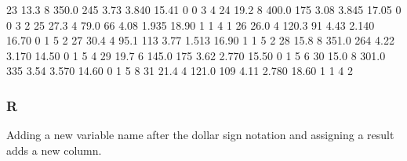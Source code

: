 \documentclass[
]{book}
\newenvironment{Shaded}{\begin{snugshade}}{\end{snugshade}}
\newcommand{\CommentTok}[1]{\textcolor[rgb]{0.56,0.35,0.01}{\textit{#1}}}
\newcommand{\DecValTok}[1]{\textcolor[rgb]{0.00,0.00,0.81}{#1}}
\newcommand{\ErrorTok}[1]{\textcolor[rgb]{0.64,0.00,0.00}{\textbf{#1}}}
\newcommand{\FloatTok}[1]{\textcolor[rgb]{0.00,0.00,0.81}{#1}}
\newcommand{\NormalTok}[1]{#1}
\newcommand{\OtherTok}[1]{\textcolor[rgb]{0.56,0.35,0.01}{#1}}
\newcommand{\SpecialCharTok}[1]{\textcolor[rgb]{0.00,0.00,0.00}{#1}}
\begin{document}
\begin{Shaded}
\begin{Highlighting}[]
\DecValTok{23}  \FloatTok{13.3}    \DecValTok{8}  \FloatTok{350.0}  \DecValTok{245}        \FloatTok{3.73}  \FloatTok{3.840}  \FloatTok{15.41}   \DecValTok{0}   \DecValTok{0}     \DecValTok{3}     \DecValTok{4}
\DecValTok{24}  \FloatTok{19.2}    \DecValTok{8}  \FloatTok{400.0}  \DecValTok{175}        \FloatTok{3.08}  \FloatTok{3.845}  \FloatTok{17.05}   \DecValTok{0}   \DecValTok{0}     \DecValTok{3}     \DecValTok{2}
\DecValTok{25}  \FloatTok{27.3}    \DecValTok{4}   \FloatTok{79.0}   \DecValTok{66}        \FloatTok{4.08}  \FloatTok{1.935}  \FloatTok{18.90}   \DecValTok{1}   \DecValTok{1}     \DecValTok{4}     \DecValTok{1}
\DecValTok{26}  \FloatTok{26.0}    \DecValTok{4}  \FloatTok{120.3}   \DecValTok{91}        \FloatTok{4.43}  \FloatTok{2.140}  \FloatTok{16.70}   \DecValTok{0}   \DecValTok{1}     \DecValTok{5}     \DecValTok{2}
\DecValTok{27}  \FloatTok{30.4}    \DecValTok{4}   \FloatTok{95.1}  \DecValTok{113}        \FloatTok{3.77}  \FloatTok{1.513}  \FloatTok{16.90}   \DecValTok{1}   \DecValTok{1}     \DecValTok{5}     \DecValTok{2}
\DecValTok{28}  \FloatTok{15.8}    \DecValTok{8}  \FloatTok{351.0}  \DecValTok{264}        \FloatTok{4.22}  \FloatTok{3.170}  \FloatTok{14.50}   \DecValTok{0}   \DecValTok{1}     \DecValTok{5}     \DecValTok{4}
\DecValTok{29}  \FloatTok{19.7}    \DecValTok{6}  \FloatTok{145.0}  \DecValTok{175}        \FloatTok{3.62}  \FloatTok{2.770}  \FloatTok{15.50}   \DecValTok{0}   \DecValTok{1}     \DecValTok{5}     \DecValTok{6}
\DecValTok{30}  \FloatTok{15.0}    \DecValTok{8}  \FloatTok{301.0}  \DecValTok{335}        \FloatTok{3.54}  \FloatTok{3.570}  \FloatTok{14.60}   \DecValTok{0}   \DecValTok{1}     \DecValTok{5}     \DecValTok{8}
\DecValTok{31}  \FloatTok{21.4}    \DecValTok{4}  \FloatTok{121.0}  \DecValTok{109}        \FloatTok{4.11}  \FloatTok{2.780}  \FloatTok{18.60}   \DecValTok{1}   \DecValTok{1}     \DecValTok{4}     \DecValTok{2}
\end{Highlighting}
\end{Shaded}

\hypertarget{r-17}{%
\subsubsection*{R}\label{r-17}}

Adding a new variable name after the dollar sign notation and assigning a result adds a new column.

\begin{Shaded}
\end{Shaded}
\end{document}
